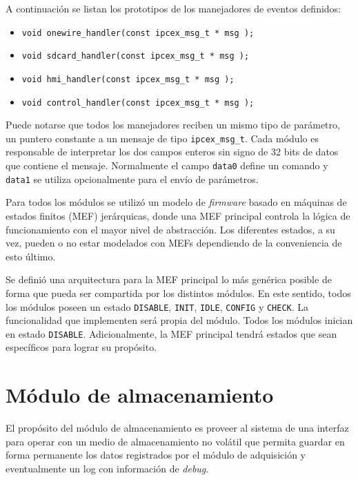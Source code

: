 A continuación se listan los prototipos de los manejadores de eventos definidos:

\vspace{10px}

\begin{itemize}
  \item \texttt{void onewire\_handler(const ipcex\_msg\_t * msg );} 
  \item \texttt{void sdcard\_handler(const ipcex\_msg\_t * msg );} 
  \item \texttt{void hmi\_handler(const ipcex\_msg\_t * msg );} 
  \item \texttt{void control\_handler(const ipcex\_msg\_t * msg );} 
\end{itemize}

\vspace{10px}

Puede notarse que todos los manejadores reciben un mismo tipo de parámetro, un puntero constante a un mensaje de tipo \texttt{ipcex\_msg\_t}.  Cada módulo es responsable de interpretar los dos campos enteros sin signo de 32 bits de datos que contiene el mensaje.  Normalmente el campo \texttt{data0} define un comando y \texttt{data1} se utiliza opcionalmente para el envío de parámetros.

Para todos los módulos se utilizó un modelo de \textit{firmware} basado en máquinas de estados finitos (MEF) jerárquicas, donde una MEF principal controla la lógica de funcionamiento con el mayor nivel de abstracción. Los diferentes estados, a su vez, pueden o no estar modelados con MEFs dependiendo de la conveniencia de esto último.

Se definió una arquitectura para la MEF principal lo más genérica posible de forma que pueda ser compartida por los distintos módulos.  En este sentido, todos los módulos poseen un estado \texttt{DISABLE}, \texttt{INIT}, \texttt{IDLE}, \texttt{CONFIG} y \texttt{CHECK}.  La funcionalidad que implementen será propia del módulo. Todos los módulos inician en estado \texttt{DISABLE}. Adicionalmente, la MEF principal tendrá estados que sean específicos para lograr su propósito.

\section{Módulo de almacenamiento}
\label{sec:almacenamiento}

El propósito del módulo de almacenamiento es proveer al sistema de una interfaz para operar con un medio de almacenamiento no volátil que permita guardar en forma permanente los datos registrados por el módulo de adquisición y eventualmente un log con información de \textit{debug}.  

